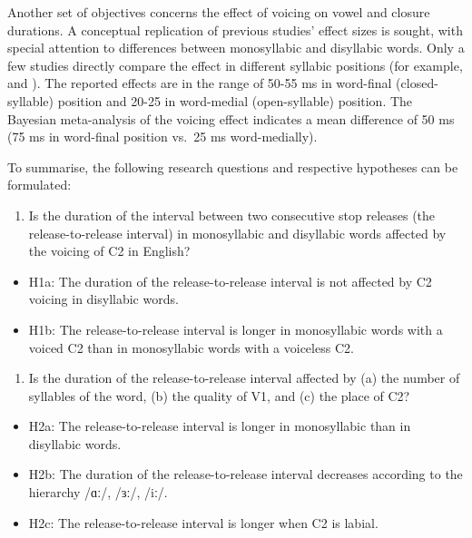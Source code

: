 \documentclass[
  12pt,
  a4paper,
  authoryear, 5p]{elsarticle}
\providecommand{\tightlist}{%
  \setlength{\itemsep}{0pt}\setlength{\parskip}{0pt}}
\begin{document}
Another set of objectives concerns the effect of voicing on vowel and
closure durations. A conceptual replication of previous studies' effect
sizes is sought, with special attention to differences between
monosyllabic and disyllabic words. Only a few studies directly compare
the effect in different syllabic positions (for example,
\citet{sharf1962} and \citet{klatt1973}). The reported effects are in
the range of 50-55 ms in word-final (closed-syllable) position and 20-25
in word-medial (open-syllable) position. The Bayesian meta-analysis of
the voicing effect indicates a mean difference of 50 ms (75 ms in
word-final position vs.~25 ms word-medially).

To summarise, the following research questions and respective hypotheses
can be formulated:

\begin{enumerate}
\def\labelenumi{\arabic{enumi}.}
\tightlist
\item
  Is the duration of the interval between two consecutive stop releases
  (the release-to-release interval) in monosyllabic and disyllabic words
  affected by the voicing of C2 in English?
\end{enumerate}

\begin{itemize}
\tightlist
\item
  H1a: The duration of the release-to-release interval is not affected
  by C2 voicing in disyllabic words.
\item
  H1b: The release-to-release interval is longer in monosyllabic words
  with a voiced C2 than in monosyllabic words with a voiceless C2.
\end{itemize}

\begin{enumerate}
\def\labelenumi{\arabic{enumi}.}
\setcounter{enumi}{1}
\tightlist
\item
  Is the duration of the release-to-release interval affected by (a) the
  number of syllables of the word, (b) the quality of V1, and (c) the
  place of C2?
\end{enumerate}

\begin{itemize}
\tightlist
\item
  H2a: The release-to-release interval is longer in monosyllabic than in
  disyllabic words.
\item
  H2b: The duration of the release-to-release interval decreases
  according to the hierarchy /ɑː/, /ɜː/, /iː/.
\item
  H2c: The release-to-release interval is longer when C2 is labial.
\end{itemize}
\end{document}
